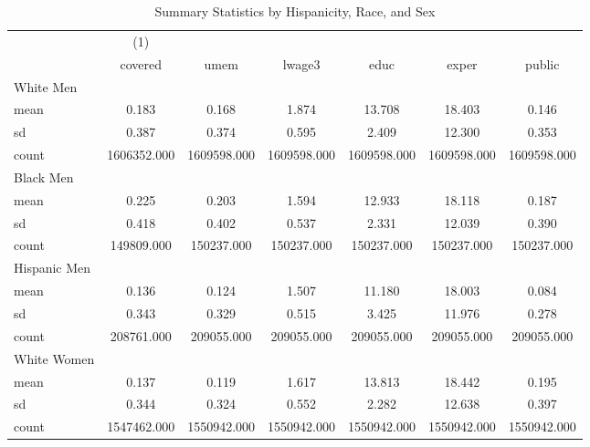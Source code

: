 {
\def\sym#1{\ifmmode^{#1}\else\(^{#1}\)\fi}
\begin{longtable}{l*{1}{cccccc}}
\caption{Summary Statistics by Hispanicity, Race, and Sex}\\
\hline\hline\endfirsthead\hline\endhead\hline\endfoot\endlastfoot
            &\multicolumn{1}{c}{(1)}&            &            &            &            &            \\
            &     covered&        umem&      lwage3&        educ&       exper&      public\\
\hline
White Men   &            &            &            &            &            &            \\
mean        &       0.183&       0.168&       1.874&      13.708&      18.403&       0.146\\
sd          &       0.387&       0.374&       0.595&       2.409&      12.300&       0.353\\
count       & 1606352.000& 1609598.000& 1609598.000& 1609598.000& 1609598.000& 1609598.000\\
\hline
Black Men   &            &            &            &            &            &            \\
mean        &       0.225&       0.203&       1.594&      12.933&      18.118&       0.187\\
sd          &       0.418&       0.402&       0.537&       2.331&      12.039&       0.390\\
count       &  149809.000&  150237.000&  150237.000&  150237.000&  150237.000&  150237.000\\
\hline
Hispanic Men&            &            &            &            &            &            \\
mean        &       0.136&       0.124&       1.507&      11.180&      18.003&       0.084\\
sd          &       0.343&       0.329&       0.515&       3.425&      11.976&       0.278\\
count       &  208761.000&  209055.000&  209055.000&  209055.000&  209055.000&  209055.000\\
\hline
White Women &            &            &            &            &            &            \\
mean        &       0.137&       0.119&       1.617&      13.813&      18.442&       0.195\\
sd          &       0.344&       0.324&       0.552&       2.282&      12.638&       0.397\\
count       & 1547462.000& 1550942.000& 1550942.000& 1550942.000& 1550942.000& 1550942.000\\

\end{longtable}}

